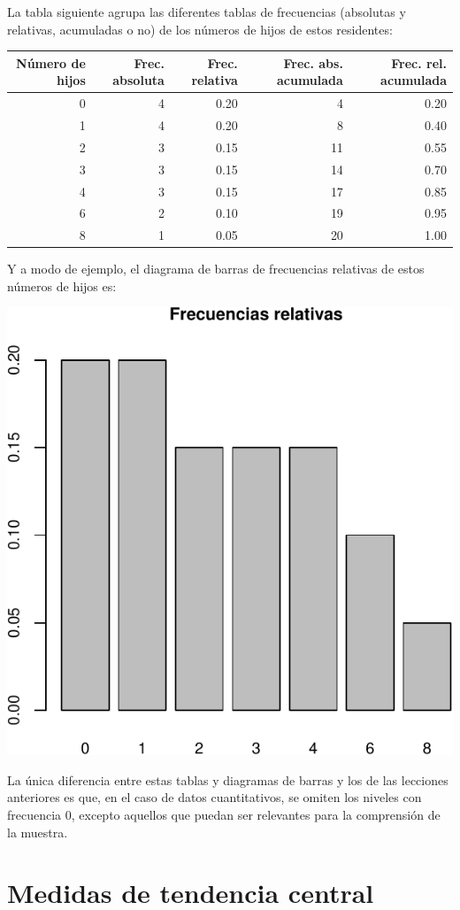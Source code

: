 \documentclass[
]{book}
\theoremstyle{definition}
\theoremstyle{definition}
\theoremstyle{definition}
\theoremstyle{definition}
\theoremstyle{remark}
\begin{document}
La tabla siguiente agrupa las diferentes tablas de frecuencias (absolutas y relativas, acumuladas o no) de los números de hijos de estos residentes:

\begin{tabular}{r|r|r|r|r}
\hline
Número de hijos & Frec. absoluta & Frec. relativa & Frec. abs. acumulada & Frec. rel. acumulada\\
\hline
0 & 4 & 0.20 & 4 & 0.20\\
\hline
1 & 4 & 0.20 & 8 & 0.40\\
\hline
2 & 3 & 0.15 & 11 & 0.55\\
\hline
3 & 3 & 0.15 & 14 & 0.70\\
\hline
4 & 3 & 0.15 & 17 & 0.85\\
\hline
6 & 2 & 0.10 & 19 & 0.95\\
\hline
8 & 1 & 0.05 & 20 & 1.00\\
\hline
\end{tabular}

Y a modo de ejemplo, el diagrama de barras de frecuencias relativas de estos números de hijos es:

\begin{center}\includegraphics[width=0.5\linewidth]{INREMDN_files/figure-latex/unnamed-chunk-249-1} \end{center}

\begin{rmdnote}
La única diferencia entre estas tablas y diagramas de barras y los de las lecciones anteriores es que, en el caso de datos cuantitativos, se omiten los niveles con frecuencia 0, excepto aquellos que puedan ser relevantes para la comprensión de la muestra.
\end{rmdnote}

\hypertarget{medidas-de-tendencia-central}{%
\section{Medidas de tendencia central}\label{medidas-de-tendencia-central}}
\end{document}
